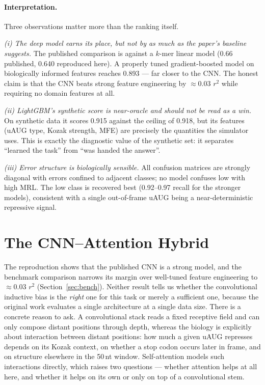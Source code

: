 \documentclass{article}
\begin{document}
\paragraph{Interpretation.} Three observations matter more than the ranking itself.

\emph{(i) The deep model earns its place, but not by as much as the paper's baseline
suggests.} The published comparison is against a $k$-mer linear model (0.66 published, 0.640
reproduced here). A properly tuned gradient-boosted model on biologically informed features
reaches 0.893 --- far closer to the CNN. The honest claim is that the CNN beats strong
feature engineering by $\approx 0.03$ $r^2$ while requiring no domain features at all.

\emph{(ii) LightGBM's synthetic score is near-oracle and should not be read as a win.} On
synthetic data it scores 0.915 against the ceiling of 0.918, but its features (uAUG type,
Kozak strength, MFE) are precisely the quantities the simulator uses. This is exactly the
diagnostic value of the synthetic set: it separates ``learned the task'' from ``was handed
the answer''.

\emph{(iii) Error structure is biologically sensible.} All confusion matrices are strongly
diagonal with errors confined to adjacent classes; no model confuses low with high MRL. The
low class is recovered best (0.92--0.97 recall for the stronger models), consistent with a
single out-of-frame uAUG being a near-deterministic repressive signal.

\section{The CNN--Attention Hybrid}
\label{sec:novelty}

The reproduction shows that the published CNN is a strong model, and the benchmark
comparison narrows its margin over well-tuned feature engineering to $\approx0.03$ $r^2$
(Section~\ref{sec:bench}). Neither result tells us whether the convolutional inductive bias
is the \emph{right} one for this task or merely a sufficient one, because the original work
evaluates a single architecture at a single data size. There is a concrete reason to ask. A
convolutional stack reads a fixed receptive field and can only compose distant positions
through depth, whereas the biology is explicitly about interaction between distant positions:
how much a given uAUG represses depends on its Kozak context, on whether a stop codon occurs
later in frame, and on structure elsewhere in the 50\,nt window. Self-attention models such
interactions directly, which raises two questions --- whether attention helps at all here, and
whether it helps on its own or only on top of a convolutional stem.
\end{document}
